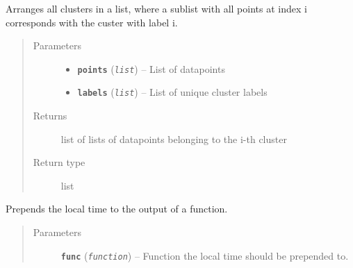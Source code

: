 \documentclass[letterpaper,10pt,english]{sphinxmanual}
\begin{document}
\begin{fulllineitems}
\label{src.clustering:src.clustering.cluster_mappings.aggregate_cluster}
Arranges all clusters in a list, where a sublist with all points at index i corresponds with the
custer with label i.
\begin{quote}\begin{description}
\item[{Parameters}] \leavevmode\begin{itemize}
\item {} 
\textbf{\texttt{points}} (\emph{\texttt{list}}) -- List of datapoints

\item {} 
\textbf{\texttt{labels}} (\emph{\texttt{list}}) -- List of unique cluster labels

\end{itemize}

\item[{Returns}] \leavevmode
list of lists of datapoints belonging to the i-th cluster

\item[{Return type}] \leavevmode
list

\end{description}\end{quote}

\end{fulllineitems}


\begin{fulllineitems}
\label{src.clustering:src.clustering.cluster_mappings.alt}
Prepends the local time to the output of a function.
\begin{quote}\begin{description}
\item[{Parameters}] \leavevmode
\textbf{\texttt{func}} (\emph{\texttt{function}}) -- Function the local time should be prepended to.

\end{description}\end{quote}

\end{fulllineitems}

\end{document}
